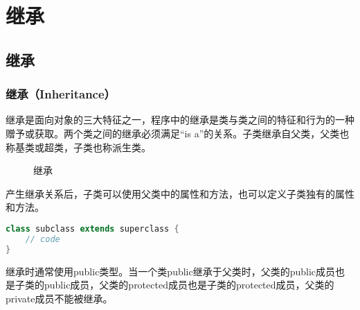 \chapter{继承}

\section{继承}

\subsection{继承（Inheritance）}

继承是面向对象的三大特征之一，程序中的继承是类与类之间的特征和行为的一种赠予或获取。两个类之间的继承必须满足“is a”的关系。子类继承自父类，父类也称基类或超类，子类也称派生类。 \\

\begin{figure}[H]
	\centering
	\caption{继承}
\end{figure}

产生继承关系后，子类可以使用父类中的属性和方法，也可以定义子类独有的属性和方法。

\vspace{-0.5cm}

\begin{lstlisting}[language=Java]
class subclass extends superclass {
    // code
}
\end{lstlisting}

继承时通常使用public类型。当一个类public继承于父类时，父类的public成员也是子类的public成员，父类的protected成员也是子类的protected成员，父类的private成员不能被继承。 \\

